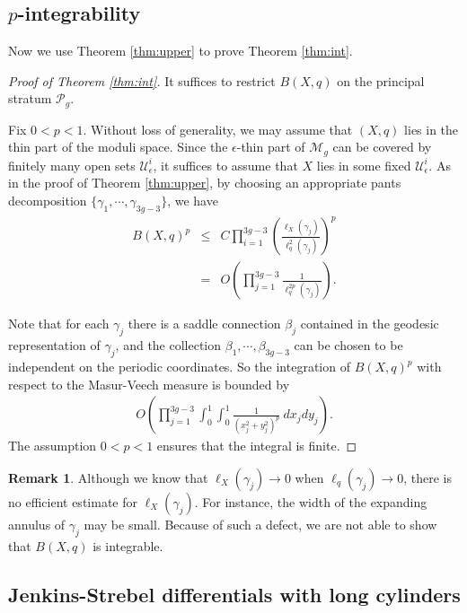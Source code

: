 \documentclass{amsart}
\theoremstyle{plain}
\theoremstyle{definition}
\newtheorem{remark}{Remark}
\numberwithin{equation}{section}
\newcommand{\Pg}{\mathcal{P}_g}
\begin{document}
\subsection{$p$-integrability}
Now we use Theorem \ref{thm:upper} to prove Theorem \ref{thm:int}.
\begin{proof}[Proof of Theorem \ref{thm:int}]
It suffices to restrict  $B(X,q)$ on  the principal stratum  $\Pg$.

Fix $0<p<1$. Without loss of generality,
we may assume that $(X,q)$ lies in the thin part of the moduli space. 
Since the $\epsilon$-thin part of $\mathcal{M}_g$ can be covered by finitely many open sets $\mathcal{U}_\epsilon^i$, it suffices to assume that $X$ lies in some fixed $\mathcal{U}_\epsilon^i$.
As in the proof of Theorem \ref{thm:upper}, by
choosing an appropriate pants decomposition $\{\gamma_1, \cdots, \gamma_{3g-3}\}$, we have
\begin{eqnarray*}
B(X,q)^p &\leq&  C \prod^{3g-3}_{i=1} \left( \frac{\ell_X(\gamma_j)}{\ell^2_q(\gamma_j)}\right)^p \\
&=& O\left( \prod^{3g-3}_{j=1} \frac{1}{\ell^{2p}_q(\gamma_j)}  \right).
\end{eqnarray*}

Note that for each $\gamma_j$ there is a 
saddle connection $\beta_j$ contained in the geodesic representation of $\gamma_j$,
and the collection $\beta_1, \cdots, \beta_{3g-3}$ can be chosen to be independent on the periodic coordinates. So the integration of $B(X,q)^p$ with respect to the Masur-Veech measure is bounded by 
\begin{eqnarray*}
 O\left( \prod_{j=1}^{3g-3} \int_{0}^{1}\int_{0}^{1} \frac{1}{(x_j^2 + y_j^2)^p} \  dx_j dy_j  \right).
\end{eqnarray*}
The assumption $0<p<1$ ensures that the integral is finite. 
\end{proof}


\begin{remark}
   Although we know that $\ell_X(\gamma_j) \to 0$ when $\ell_q(\gamma_j)\to 0$,
  there is no efficient estimate for $\ell_X(\gamma_j)$. For instance, 
  the width of the expanding annulus of $\gamma_j$ may be small. Because of such a defect, we are not able to show that $B(X,q)$ is integrable.
\end{remark}


\subsection{Jenkins-Strebel differentials with long cylinders}
\end{document}
